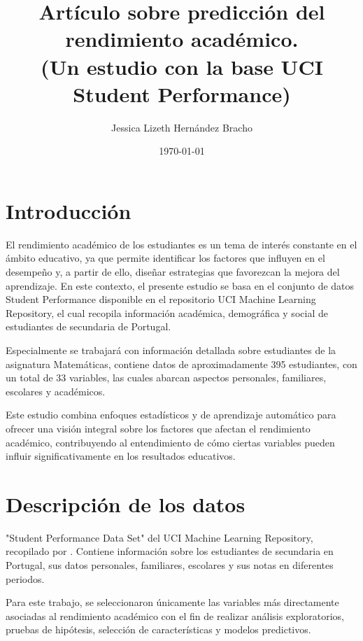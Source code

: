 \documentclass{article}
\title{Artículo sobre predicción del rendimiento académico. \\ [0.5em]\large (Un estudio con la base UCI Student Performance)}
\author{Jessica Lizeth Hernández Bracho}
\date{\today}
\begin{document}
\maketitle

\section{Introducción}

El rendimiento académico de los estudiantes es un tema de interés constante en el ámbito educativo, ya que permite identificar los factores que influyen en el desempeño y, a partir de ello, diseñar estrategias que favorezcan la mejora del aprendizaje. En este contexto, el presente estudio se basa en el conjunto de datos Student Performance disponible en el repositorio UCI Machine Learning Repository, el cual recopila información académica, demográfica y social de estudiantes de secundaria de Portugal.


Especialmente se trabajará con información detallada sobre estudiantes de la asignatura Matemáticas, contiene datos de aproximadamente 395 estudiantes, con un total de 33 variables, las cuales abarcan aspectos personales, familiares, escolares y académicos.


Este estudio combina enfoques estadísticos y de aprendizaje automático para ofrecer una visión integral sobre los factores que afectan el rendimiento académico, contribuyendo al entendimiento de cómo ciertas variables pueden influir significativamente en los resultados educativos.


\section{Descripción de los datos}

"Student Performance Data Set" del UCI Machine Learning Repository, recopilado por \citeauthor{student_performance_320} \citeyear{student_performance_320}.
Contiene información sobre los estudiantes de secundaria en Portugal, sus datos personales, familiares, escolares y sus notas en diferentes periodos.


Para este trabajo, se seleccionaron únicamente las variables más directamente asociadas al rendimiento académico con el fin de realizar análisis exploratorios, pruebas de hipótesis, selección de características y modelos predictivos.
\end{document}
